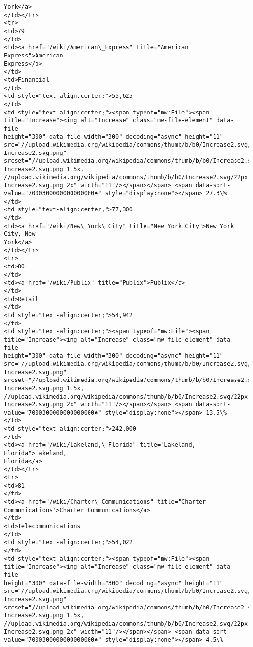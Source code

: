 \documentclass[11pt]{article}
\begin{document}
\begin{Verbatim}[commandchars=\\\{\}]
York</a>
</td></tr>
<tr>
<td>79
</td>
<td><a href="/wiki/American\_Express" title="American Express">American
Express</a>
</td>
<td>Financial
</td>
<td style="text-align:center;">55,625
</td>
<td style="text-align:center;"><span typeof="mw:File"><span
title="Increase"><img alt="Increase" class="mw-file-element" data-file-
height="300" data-file-width="300" decoding="async" height="11"
src="//upload.wikimedia.org/wikipedia/commons/thumb/b/b0/Increase2.svg/11px-
Increase2.svg.png"
srcset="//upload.wikimedia.org/wikipedia/commons/thumb/b/b0/Increase2.svg/17px-
Increase2.svg.png 1.5x,
//upload.wikimedia.org/wikipedia/commons/thumb/b/b0/Increase2.svg/22px-
Increase2.svg.png 2x" width="11"/></span></span> <span data-sort-
value="7000300000000000000♠" style="display:none"></span> 27.3\%
</td>
<td style="text-align:center;">77,300
</td>
<td><a href="/wiki/New\_York\_City" title="New York City">New York City, New
York</a>
</td></tr>
<tr>
<td>80
</td>
<td><a href="/wiki/Publix" title="Publix">Publix</a>
</td>
<td>Retail
</td>
<td style="text-align:center;">54,942
</td>
<td style="text-align:center;"><span typeof="mw:File"><span
title="Increase"><img alt="Increase" class="mw-file-element" data-file-
height="300" data-file-width="300" decoding="async" height="11"
src="//upload.wikimedia.org/wikipedia/commons/thumb/b/b0/Increase2.svg/11px-
Increase2.svg.png"
srcset="//upload.wikimedia.org/wikipedia/commons/thumb/b/b0/Increase2.svg/17px-
Increase2.svg.png 1.5x,
//upload.wikimedia.org/wikipedia/commons/thumb/b/b0/Increase2.svg/22px-
Increase2.svg.png 2x" width="11"/></span></span> <span data-sort-
value="7000300000000000000♠" style="display:none"></span> 13.5\%
</td>
<td style="text-align:center;">242,000
</td>
<td><a href="/wiki/Lakeland,\_Florida" title="Lakeland, Florida">Lakeland,
Florida</a>
</td></tr>
<tr>
<td>81
</td>
<td><a href="/wiki/Charter\_Communications" title="Charter
Communications">Charter Communications</a>
</td>
<td>Telecommunications
</td>
<td style="text-align:center;">54,022
</td>
<td style="text-align:center;"><span typeof="mw:File"><span
title="Increase"><img alt="Increase" class="mw-file-element" data-file-
height="300" data-file-width="300" decoding="async" height="11"
src="//upload.wikimedia.org/wikipedia/commons/thumb/b/b0/Increase2.svg/11px-
Increase2.svg.png"
srcset="//upload.wikimedia.org/wikipedia/commons/thumb/b/b0/Increase2.svg/17px-
Increase2.svg.png 1.5x,
//upload.wikimedia.org/wikipedia/commons/thumb/b/b0/Increase2.svg/22px-
Increase2.svg.png 2x" width="11"/></span></span> <span data-sort-
value="7000300000000000000♠" style="display:none"></span> 4.5\%

\end{Verbatim}
\end{document}

